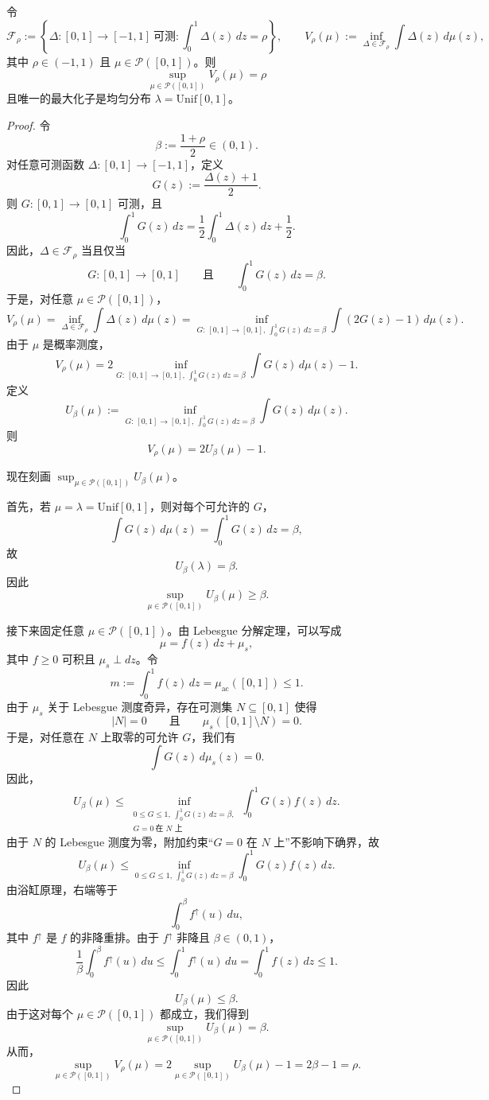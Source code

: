 \begin{theorem}
令
\[
\mathcal F_\rho
:=
\left\{
\Delta:[0,1]\to[-1,1]\ \text{可测} :
\int_0^1 \Delta(z)\,dz = \rho
\right\},
\qquad
V_\rho(\mu)
:=
\inf_{\Delta\in\mathcal F_\rho}\int \Delta(z)\,d\mu(z),
\]
其中 $\rho\in(-1,1)$ 且 $\mu\in\mathcal P([0,1])$。则
\[
\sup_{\mu\in\mathcal P([0,1])} V_\rho(\mu)=\rho\]
且唯一的最大化子是均匀分布 $\lambda=\mathrm{Unif}[0,1]$。
\end{theorem}

\begin{proof}
令
\[
\beta := \frac{1+\rho}{2}\in(0,1).
\]
对任意可测函数 $\Delta:[0,1]\to[-1,1]$，定义
\[
G(z):=\frac{\Delta(z)+1}{2}.
\]
则 $G:[0,1]\to[0,1]$ 可测，且
\[
\int_0^1 G(z)\,dz
=
\frac{1}{2}\int_0^1 \Delta(z)\,dz+\frac{1}{2}.
\]
因此，$\Delta \in \mathcal F_\rho$ 当且仅当
\[
G:[0,1]\to[0,1]
\qquad\text{且}\qquad
\int_0^1 G(z)\,dz=\beta.
\]
于是，对任意 $\mu\in\mathcal P([0,1])$，
\[
V_\rho(\mu)
=
\inf_{\Delta\in\mathcal F_\rho}\int \Delta(z)\, d\mu(z)
=
\inf_{G:\,[0,1]\to[0,1],\, \int_0^1 G(z)\,dz=\beta}
\int (2G(z)-1)\, d\mu(z).
\]
由于 $\mu$ 是概率测度，
\[
V_\rho(\mu)
=
2 \inf_{G:\,[0,1]\to[0,1],\, \int_0^1 G(z)\,dz=\beta}
\int G(z)\, d\mu(z)-1.
\]
定义
\[
U_\beta(\mu)
:=
\inf_{G:\,[0,1]\to[0,1],\, \int_0^1 G(z)\,dz=\beta}
\int G(z)\, d\mu(z).
\]
则
\[
V_\rho(\mu)=2U_\beta(\mu)-1.
\]

现在刻画 $\sup_{\mu\in\mathcal P([0,1])} U_\beta(\mu)$。

首先，若 $\mu=\lambda=\mathrm{Unif}[0,1]$，则对每个可允许的 $G$，
\[
\int G(z)\, d\mu(z)
=
\int_0^1 G(z)\,dz
=
\beta,
\]
故
\[
U_\beta(\lambda)=\beta.
\]
因此
\[
\sup_{\mu\in\mathcal P([0,1])} U_\beta(\mu)\ge \beta.
\]

接下来固定任意 $\mu\in\mathcal P([0,1])$。由 Lebesgue 分解定理，可以写成
\[
\mu = f(z)\,dz + \mu_s,
\]
其中 \(f\ge 0\) 可积且 \(\mu_s \perp dz\)。令
\[
m := \int_0^1 f(z)\,dz = \mu_{\mathrm{ac}}([0,1]) \le 1.
\]
由于 \(\mu_s\) 关于 Lebesgue 测度奇异，存在可测集 \(N\subseteq[0,1]\) 使得
\[
|N|=0
\qquad\text{且}\qquad
\mu_s([0,1]\setminus N)=0.
\]
于是，对任意在 \(N\) 上取零的可允许 \(G\)，我们有
\[
\int G(z)\, d\mu_s(z)=0.
\]
因此，
\[
U_\beta(\mu)
\le
\inf_{\substack{0\le G\le 1,\ \int_0^1 G(z)\,dz=\beta,\\ G=0\ \text{在 }N\text{ 上}}}
\int_0^1 G(z) f(z)\,dz.
\]
由于 \(N\) 的 Lebesgue 测度为零，附加约束“\(G=0\) 在 \(N\) 上”不影响下确界，故
\[
U_\beta(\mu)
\le
\inf_{0\le G\le 1,\ \int_0^1 G(z)\,dz=\beta}
\int_0^1 G(z) f(z)\,dz.
\]
由浴缸原理，右端等于
\[
\int_0^\beta f^\uparrow(u)\,du,
\]
其中 \(f^\uparrow\) 是 \(f\) 的非降重排。由于 \(f^\uparrow\) 非降且 $\beta \in (0,1)$，
\[
\frac{1}{\beta}\int_0^\beta f^\uparrow(u)\,du
\le
\int_0^1 f^\uparrow(u)\,du
=
\int_0^1 f(z)\,dz \le 1.
\]
因此
\[
U_\beta(\mu)\le \beta.
\]
由于这对每个 \(\mu\in\mathcal P([0,1])\) 都成立，我们得到
\[
\sup_{\mu\in\mathcal P([0,1])} U_\beta(\mu)=\beta.
\]
从而，
\[
\sup_{\mu\in\mathcal P([0,1])} V_\rho(\mu)
=
2\sup_{\mu\in\mathcal P([0,1])} U_\beta(\mu)-1
=
2\beta-1
=
\rho.
\]


\end{proof}
